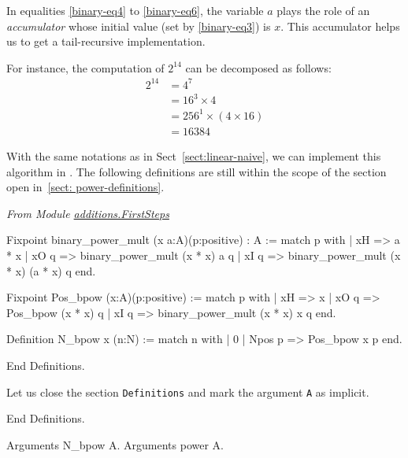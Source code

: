 In equalities \ref{binary-eq4} to \ref{binary-eq6}, the variable $a$ plays the role
of an \emph{accumulator} whose initial value (set by \ref{binary-eq3}) is $x$.
This accumulator helps us to get a tail-recursive implementation.

For instance, the computation of $2^{14}$ can be decomposed as follows:
\begin{align*}
2^{14} &= 4^{7} \\
      &= 16^3 \times 4 \\
      &= 256^1 \times (4 \times 16) \\
      &= 16384  
\end{align*}

With the same notations as in Sect~\vref{sect:linear-naive}, we can implement this algorithm in \gallina. The following definitions are still within the scope of the 
section open in~\vref{sect: power-definitions}.



\label{polymorhic-binary_exp}


\vspace{4pt}

\emph{From Module
\href{../theories/html/additions.FirstSteps.html}{additions.FirstSteps}}


\begin{Coqsrc}
Fixpoint binary_power_mult (x a:A)(p:positive) : A 
  :=
  match p with
    | xH =>  a * x
    | xO q => binary_power_mult  (x * x) a q
    | xI q =>  binary_power_mult  (x * x) (a * x) q
  end.

Fixpoint Pos_bpow (x:A)(p:positive) :=
 match p with
  | xH => x
  | xO q => Pos_bpow  (x * x) q
  | xI q => binary_power_mult   (x * x) x q
end.

Definition N_bpow x (n:N) := 
  match n with 
  | 0%
  | Npos p => Pos_bpow x p
  end.

End Definitions.
\end{Coqsrc}




Let us  close the section \texttt{Definitions} and mark the argument \texttt{A} as implicit.

\begin{Coqsrc}
End Definitions.

Arguments N_bpow {A}.
Arguments power {A}.
\end{Coqsrc}


